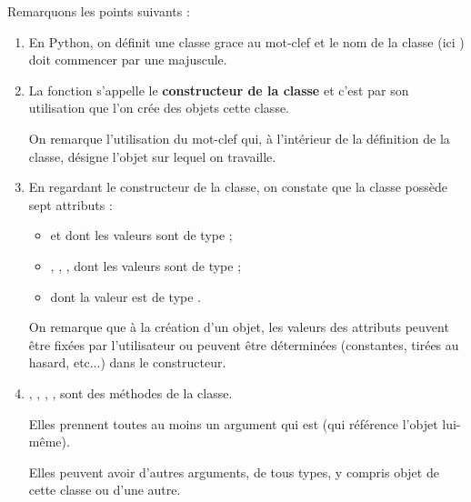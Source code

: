 \documentclass[11pt,a4paper,french,twoside]{PMCours}
\begin{document}
Remarquons les points suivants :
\begin{enumerate}
\item En Python, on définit une classe grace au mot-clef  et le nom 
de la classe (ici ) doit commencer par une majuscule.
\item La fonction  s'appelle le {\bf constructeur de la classe} 
et c'est par son utilisation que l'on crée des objets cette classe.

On remarque l'utilisation du mot-clef  qui, à l'intérieur de la définition
de la classe, désigne l'objet sur lequel on travaille.

\item En regardant le constructeur de la classe, on constate que la classe 
 possède sept attributs :
\begin{itemize}
    \item {} et  dont les valeurs sont de type ;
    \item {}, , ,  dont les 
    valeurs sont de type ;
    \item {} dont la valeur est de type .
\end{itemize}
On remarque que à la création d'un objet, les valeurs des attributs peuvent être fixées 
par l'utilisateur ou peuvent être déterminées (constantes, tirées au hasard, etc...) 
dans le constructeur.
\item {}, , , 
,  sont des méthodes de la classe.

Elles prennent toutes au moins un argument qui est  (qui référence 
l'objet lui-même).

Elles peuvent avoir d'autres arguments, de tous types, y compris objet de cette 
classe ou d'une autre.

\end{enumerate}
\end{document}
